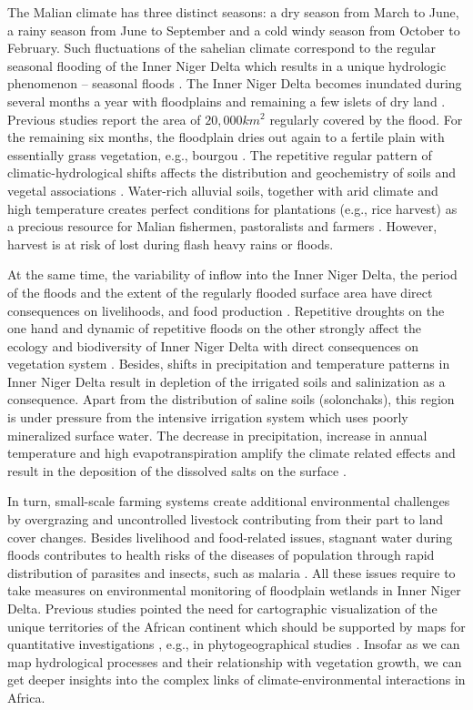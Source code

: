 \documentclass[12pt,a4paper,oneside]{article}
\def \newpar{\vspace{6pt}}
\begin{document}
\newpar The Malian climate has three distinct seasons: a dry season from March to June, a rainy season from June to September and a cold windy season from October to February. Such fluctuations of the sahelian climate correspond to the regular seasonal flooding of the Inner Niger Delta which results in a unique hydrologic phenomenon -- seasonal floods \citep{brunet1986monographie}. The Inner Niger Delta becomes inundated during several months a year with floodplains and remaining a few islets of dry land \citep{Courel}. Previous studies report \citep{Diakite} the area of $20,000 km^2$ regularly covered by the flood. For the remaining six months, the floodplain dries out again to a fertile plain with essentially grass vegetation, e.g., bourgou \citep{Planhol}. The repetitive regular pattern of climatic-hydrological shifts affects the distribution and geochemistry of soils and vegetal associations \citep{Tabeaud}. Water-rich alluvial soils, together with arid climate and high temperature creates perfect conditions for plantations (e.g., rice harvest) as a precious resource for Malian fishermen, pastoralists and farmers \citep{Retaille}. However, harvest is at risk of lost during flash heavy rains or floods. 

\newpar At the same time, the variability of inflow into the Inner Niger Delta, the period of the floods and the extent of the regularly flooded surface area have direct consequences on livelihoods, and food production \citep{LIERSCH201318}. Repetitive droughts on the one hand and dynamic of repetitive floods on the other strongly affect the ecology and biodiversity of Inner Niger Delta with direct consequences on vegetation system \citep{mariko2003caracterisation}. Besides, shifts in precipitation and temperature patterns in Inner Niger Delta result in depletion of the irrigated soils and salinization as a consequence. Apart from the distribution of saline soils (solonchaks), this region is under pressure from the intensive irrigation system which uses poorly mineralized surface water. The decrease in precipitation, increase in annual temperature and high evapotranspiration amplify the climate related effects and result in the deposition of the dissolved salts on the surface \citep{Valenza}. 

\newpar In turn, small-scale farming systems create additional environmental challenges by overgrazing and uncontrolled livestock contributing from their part to land cover changes. Besides livelihood and food-related issues, stagnant water during floods contributes to health risks of the diseases of population through rapid distribution of parasites and insects, such as malaria \citep{COOLS201334,Klinkenberg}. All these issues require to take measures on environmental monitoring of floodplain wetlands in Inner Niger Delta. Previous studies pointed the need for cartographic visualization of the unique territories of the African continent which should be supported by maps for quantitative investigations \citep{Cabot1968}, e.g., in phytogeographical studies \citep{Robequain}. Insofar as we can map hydrological processes and their relationship with vegetation growth, we can get deeper insights into the complex links of climate-environmental interactions in Africa.
\end{document}
